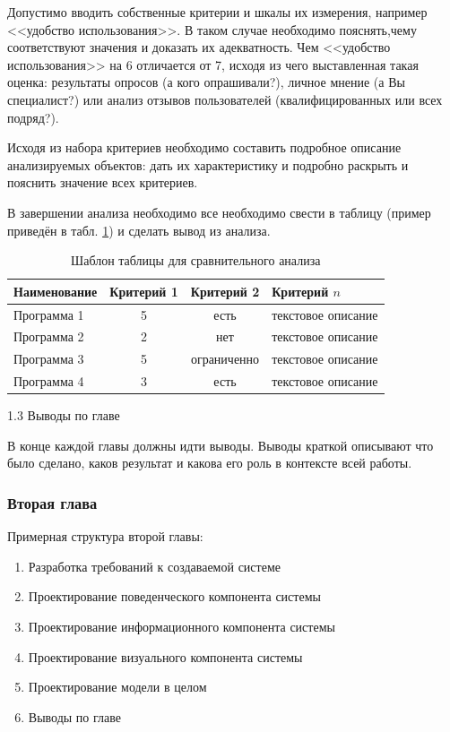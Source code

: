 Допустимо вводить собственные критерии и шкалы их измерения, например <<удобство использования>>. В таком случае необходимо пояснять,чему соответствуют значения и доказать их адекватность. Чем <<удобство использования>> на 6 отличается от 7, исходя из чего выставленная такая оценка: результаты опросов (а кого опрашивали?), личное мнение (а Вы специалист?) или анализ отзывов пользователей (квалифицированных или всех подряд?).  

Исходя из набора критериев необходимо составить подробное описание анализируемых объектов: дать их характеристику и подробно раскрыть и пояснить значение всех критериев.

В завершении анализа необходимо все необходимо свести в таблицу (пример приведён в табл. \ref{tbl:analyzetemplate}) и сделать вывод из анализа. 

\begin{table}
	\caption{Шаблон таблицы для сравнительного анализа}\label{tbl:analyzetemplate}
	\begin{tabularx}{\linewidth}{|X|c|c|m{3cm}|}
		\hline
		\bfseries Наименование  & \bfseries Критерий 1 & \bfseries Критерий 2 & \centering\bfseries Критерий $n$ \arraybackslash\\ \hline
		Программа 1   &  5  &  есть   &  текстовое описание  \\ \hline
		Программа 2   &  2  &  нет    &  текстовое описание  \\ \hline
		Программа 3   &  5  &  ограниченно   &  текстовое описание  \\ \hline
		Программа 4   &  3  &  есть   &  текстовое описание  \\ \hline
	\end{tabularx}
\end{table}



1.3 Выводы по главе 

В конце каждой главы должны идти выводы. Выводы краткой описывают что было сделано, каков результат и какова его роль в контексте всей работы.


\subsubsection{Вторая глава}


Примерная структура второй главы:
\begin{enumerate} [
	label=2.\arabic*.,
	labelwidth=\widthof{0.0.},
	itemindent=\the\labelwidth+\the\labelsep]
	\item Разработка требований  к создаваемой системе
	\item Проектирование поведенческого компонента системы
	\item Проектирование информационного компонента системы
	\item Проектирование визуального компонента системы
	\item Проектирование модели в целом
	\item Выводы по главе		
\end{enumerate}

